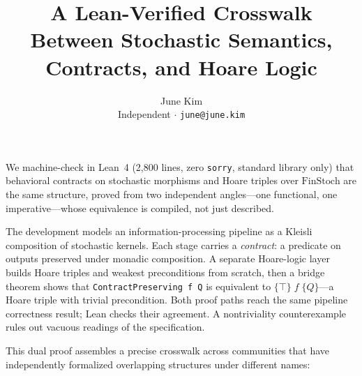 \documentclass[11pt,a4paper]{article}
\title{A Lean-Verified Crosswalk Between Stochastic Semantics,\\Contracts, and Hoare Logic}
\author{June Kim\\{\small Independent $\cdot$ \texttt{june@june.kim}}}
\date{}
\begin{document}
\maketitle
\thispagestyle{empty}

\noindent
We machine-check in Lean~4 (2,800 lines, zero \texttt{sorry}, standard library only) that behavioral contracts on stochastic morphisms and Hoare triples over $\mathrm{FinStoch}$ are the same structure, proved from two independent angles---one functional, one imperative---whose equivalence is compiled, not just described.

The development models an information-processing pipeline as a Kleisli composition of stochastic kernels. Each stage carries a \emph{contract}: a predicate on outputs preserved under monadic composition. A separate Hoare-logic layer builds Hoare triples and weakest preconditions from scratch, then a bridge theorem shows that \texttt{ContractPreserving\,f\,Q} is equivalent to $\{\top\}\;f\;\{Q\}$---a Hoare triple with trivial precondition. Both proof paths reach the same pipeline correctness result; Lean checks their agreement. A nontriviality counterexample rules out vacuous readings of the specification.

\medskip\noindent
This dual proof assembles a precise crosswalk across communities that have independently formalized overlapping structures under different names:
\end{document}
